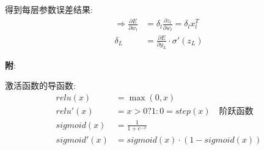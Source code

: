 \documentclass{article}
\begin{document}
        		得到每层参数误差结果:
        		    \begin{align*}
        		        \Rightarrow \frac{\partial E}{\partial w_l} &= \delta_l \frac{\partial z_l}{\partial w_l} = \delta_l x_l^T\\
        		        \delta_L &= \frac{\partial E}{\partial y_L} ·\sigma '(z_L)
        		    \end{align*}
        		    
            \textbf{附}:
            
        		激活函数的导函数:
        		    \begin{align*}
        		        relu(x) &= \max(0, x)\\
        		        relu'(x) &= x > 0 ? 1 : 0 = step(x) \quad \text{阶跃函数}\\
        		        sigmoid(x) &= \frac{1}{1+e^{-x}}\\
        		        sigmoid'(x) &= sigmoid(x) · (1 - sigmoid(x))
        		    \end{align*}

 
\end{document}
